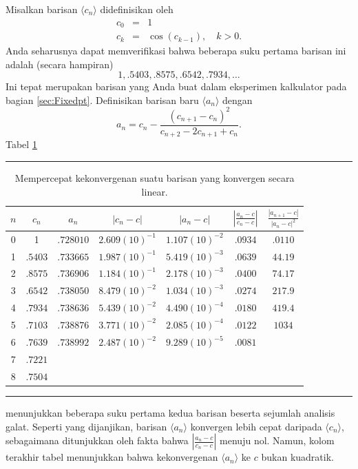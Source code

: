 Misalkan barisan $\langle c_{n}\rangle$ didefinisikan oleh
\begin{eqnarray*}
c_{0} & = & 1\\
c_{k} & = & \cos(c_{k-1}),\quad k>0.
\end{eqnarray*}
Anda seharusnya dapat memverifikasi bahwa beberapa suku pertama barisan
ini adalah (secara hampiran)
\[
1,.5403,.8575,.6542,.7934,\ldots
\]
Ini tepat merupakan barisan yang Anda buat dalam eksperimen kalkulator
 pada bagian \ref{sec:Fixedpt}. Definisikan
barisan baru $\langle a_{n}\rangle$ dengan
\[
a_{n}=c_{n}-\frac{(c_{n+1}-c_{n})^{2}}{c_{n+2}-2c_{n+1}+c_{n}}.
\]
Tabel \ref{tab:deltaSquaredAcceleration} 
\begin{table}
\hrule 

\caption{\label{tab:deltaSquaredAcceleration}Mempercepat kekonvergenan suatu
barisan yang konvergen secara linear.}

\centering{}\medskip{}
\begin{tabular}{c|cccccc}
$n$ & $c_{n}$ & $a_{n}$ & $|c_{n}-c|$ & $|a_{n}-c|$ & $\left|\frac{a_{n}-c}{c_{n}-c}\right|$ & $\frac{\left|a_{n+1}-c\right|}{\left|a_{n}-c\right|^{2}}$\tabularnewline
\hline 
0 & 1 & $.728010$ & $2.609(10)^{-1}$ & $1.107(10)^{-2}$ & $.0934$ & $.0110$\tabularnewline
1 & $.5403$ & $.733665$ & $1.987(10)^{-1}$ & $5.419(10)^{-3}$ & $.0639$ & $44.19$\tabularnewline
2 & $.8575$ & $.736906$ & $1.184(10)^{-1}$ & $2.178(10)^{-3}$ & $.0400$ & $74.17$\tabularnewline
3 & $.6542$ & $.738050$ & $8.479(10)^{-2}$ & $1.034(10)^{-3}$ & $.0274$ & $217.9$\tabularnewline
4 & $.7934$ & $.738636$ & $5.439(10)^{-2}$ & $4.490(10)^{-4}$ & $.0180$ & $419.4$\tabularnewline
5 & $.7103$ & $.738876$ & $3.771(10)^{-2}$ & $2.085(10)^{-4}$ & $.0122$ & $1034$\tabularnewline
6 & $.7639$ & $.738992$ & $2.487(10)^{-2}$ & $9.289(10)^{-5}$ & $.0081$ & \tabularnewline
7 & $.7221$ &  &  &  &  & \tabularnewline
8 & $.7504$ &  &  &  &  & \tabularnewline
\end{tabular}\medskip{}
\hrule 
\end{table}
 menunjukkan beberapa suku pertama kedua barisan beserta sejumlah
analisis galat. Seperti yang dijanjikan, barisan $\langle a_{n}\rangle$
konvergen lebih cepat daripada $\langle c_{n}\rangle$, sebagaimana
ditunjukkan oleh fakta bahwa $\left|\frac{a_{n}-c}{c_{n}-c}\right|$
menuju nol. Namun, kolom terakhir tabel menunjukkan bahwa kekonvergenan
$\langle a_{n}\rangle$ ke $c$ bukan kuadratik.

